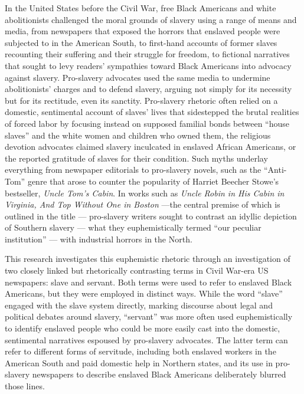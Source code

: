 \documentclass[11pt]{article}
\begin{document}
In the United States before the Civil War, free Black Americans and white abolitionists challenged the moral grounds of slavery using a range of means and media, from newspapers that exposed the horrors that enslaved people were subjected to in the American South, to first-hand accounts of former slaves recounting their suffering and their struggle for freedom, to fictional narratives that sought to levy readers’ sympathies toward Black Americans into 
advocacy against slavery. 
Pro-slavery advocates used the same media to undermine abolitionists’ charges and to defend slavery, arguing not simply for its necessity but for its rectitude, even its sanctity. 
Pro-slavery rhetoric often relied on a domestic, sentimental account of slaves’ lives that sidestepped the brutal realities of forced labor by focusing instead on supposed familial bonds between ``house slaves'' and the white women and children who owned them, the religious devotion advocates claimed slavery inculcated in enslaved African Americans, or the reported gratitude of slaves for their condition. 
Such myths underlay everything from newspaper editorials to pro-slavery novels, such as the ``Anti-Tom'' genre that arose to counter the popularity of Harriet Beecher Stowe’s bestseller, \textit{Uncle Tom’s Cabin}. 
In works such as \textit{Uncle Robin in His Cabin in Virginia, And Top Without One in Boston} —the central premise of which is outlined in the title — pro-slavery writers sought to contrast an idyllic depiction of Southern slavery 
— what they euphemistically termed “our peculiar institution” — with industrial horrors in the North. 

This research investigates this euphemistic rhetoric through an investigation of two closely linked but rhetorically contrasting terms in Civil War-era US newspapers: slave and servant. Both terms were used to refer to enslaved Black Americans, but they were employed in distinct ways. 
While the word ``slave'' engaged with the slave system directly, marking discourse about legal and political debates around slavery, ``servant'' was more often used euphemistically to identify enslaved people who could be more easily cast into the domestic, sentimental narratives espoused by pro-slavery advocates. 
The latter term can refer to different forms of servitude, including both enslaved workers in the American South and paid domestic help in Northern states, and its use in pro-slavery newspapers to describe enslaved Black Americans deliberately blurred those lines. 
\end{document}
